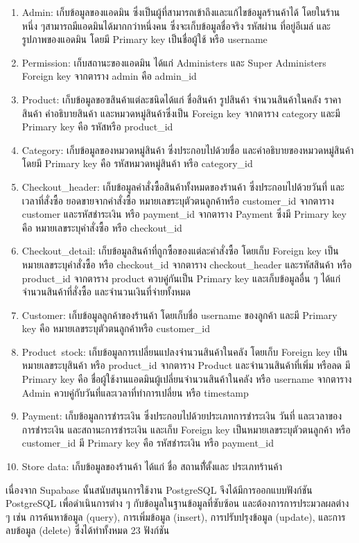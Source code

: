 \begin{enumerate}
  \item Admin: เก็บข้อมูลของแอดมิน ซึ่งเป็นผู้ที่สามารถเข้าถึงและแก้ไขข้อมูลร้านค้าได้ โดยในร้านหนึ่ง ๆสามารถมีแอดมินได้มากกว่าหนึ่งคน ซึ่งจะเก็บข้อมูลชื่อจริง รหัสผ่าน ที่อยู่อีเมล์ และรูปภาพของแอดมิน โดยมี Primary key เป็นชื่อผู้ใช้ หรือ username
  \item Permission: เก็บสถานะของแอดมิน ได้แก่ Administers และ Super Administers Foreign key จากตาราง admin คือ admin\_id
  \item Product: เก็บข้อมูลขอฃสินค้าแต่ละชนิดได้แก่ ชื่อสินค้า รูปสินค้า จำนวนสินค้าในคลัง ราคาสินค้า คำอธิบายสินค้า และหมวดหมู่สินค้าซึ่งเป็น Foreign key จากตาราง category และมี Primary key คือ รหัสหรือ product\_id
  \item Category: เก็บข้อมูลของหมวดหมู่สินค้า ซึ่งประกอบไปด้วยชื่อ และคำอธิบายของหมวดหมู่สินค้า โดยมี Primary key คือ รหัสหมวดหมู่สินค้า หรือ category\_id
  \item Checkout\_header: เก็บข้อมูลคำสั่งซื้อสินค้าทั้งหมดของร้านค้า ซึ่งประกอบไปด้วยวันที่ และเวลาที่สั่งซื้อ ยอดขายจากคำสั่งซื้อ หมายเลขระบุตัวตนลูกค้าหรือ customer\_id จากตาราง customer และรหัสชำระเงิน หรือ payment\_id  จากตาราง Payment ซึ่งมี Primary key คือ หมายเลขระบุคำสั่งซื้อ หรือ checkout\_id
  \item Checkout\_detail: เก็บข้อมูลสินค้าที่ถูกซื้อของแต่ละคำสั่งซื้อ โดยเก็บ Foreign key เป็นหมายเลขระบุคำสั่งซื้อ หรือ checkout\_id จากตาราง checkout\_header และรหัสสินค้า หรือ product\_id จากตาราง product ควบคู่กันเป็น Primary key และเก็บข้อมูลอื่น ๆ ได้แก่ จำนวนสินค้าที่สั่งซื้อ และจำนวนเงินที่จ่ายทั้งหมด
  \item Customer: เก็บข้อมูลลูกค้าของร้านค้า โดยเก็บชื่อ username ของลูกค้า และมี Primary key คือ หมายเลขระบุตัวตนลูกค้าหรือ customer\_id
  \item Product\ stock: เก็บข้อมูลการเปลี่ยนแปลงจำนวนสินค้าในคลัง โดยเก็บ Foreign key เป็นหมายเลขระบุสินค้า หรือ product\_id จากตาราง Product และจำนวนสินค้าที่เพิ่ม หรือลด มี Primary key คือ ชื่อผู้ใช้งานแอดมินผู้เปลี่ยนจำนวนสินค้าในคลัง หรือ username จากตาราง Admin ควบคู่กับวันที่และเวลาที่ทำการเปลี่ยน หรือ timestamp
  \item Payment: เก็บข้อมูลการชำระเงิน ซึ่งประกอบไปด้วยประเภทการชำระเงิน วันที่ และเวลาของการชำระเงิน และสถานะการชำระเงิน และเก็บ Foreign key เป็นหมายเลขระบุตัวตนลูกค้า หรือ customer\_id  มี Primary key คือ รหัสชำระเงิน หรือ payment\_id
  \item Store data: เก็บข้อมูลของร้านค้า ได้แก่ ชื่อ สถานที่ัตั้งและ ประเภทร้านค้า

\end{enumerate}
เนื่องจาก Supabase นั้นสนับสนุนการใช้งาน PostgreSQL จึงได้มีการออกแบบฟังก์ชัน PostgreSQL เพื่อดำเนินการต่าง ๆ กับข้อมูลในฐานข้อมูลที่ซับซ้อน และต้องการการประมวลผลต่าง ๆ เช่น การค้นหาข้อมูล (query), การเพิ่มข้อมูล (insert), การปรับปรุงข้อมูล (update), และการลบข้อมูล (delete) ซึ่งได้ทำทั้งหมด 23 ฟังก์ชัน


